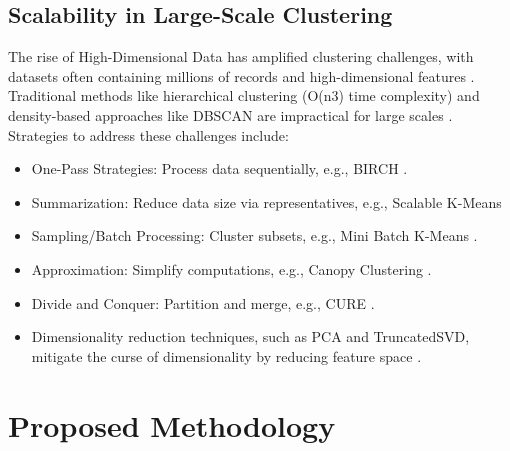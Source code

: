 \documentclass[twoside,11pt]{article}
\renewcommand{\cite}{\citep}
\begin{document}
\subsection{Scalability in Large-Scale Clustering}
The rise of High-Dimensional Data has amplified clustering challenges, with datasets often containing millions of records and high-dimensional features \cite{adil2014}. Traditional methods like hierarchical clustering (O(n3) time complexity) and density-based approaches like DBSCAN are impractical for large scales \cite{ester1996}. Strategies to address these challenges include:
\begin{itemize}[nosep]
    \item One-Pass Strategies: Process data sequentially, e.g., BIRCH \cite{zhang1997}\cite{khalid2015}.
    \item Summarization: Reduce data size via representatives, e.g., Scalable K-Means \cite{bahmani2012}\cite{feldman2018}
    \item Sampling/Batch Processing: Cluster subsets, e.g., Mini Batch K-Means \cite{sculley2010}\cite{peng2018}.
	\item Approximation: Simplify computations, e.g., Canopy Clustering \cite{sabah2021}\cite{mccallum2000}.
	\item Divide and Conquer: Partition and merge, e.g., CURE \cite{guha1998}.
	\item Dimensionality reduction techniques, such as PCA and TruncatedSVD, mitigate the curse of dimensionality by reducing feature space \cite{halko2011}.
\end{itemize}

\section{Proposed Methodology}
\end{document}
